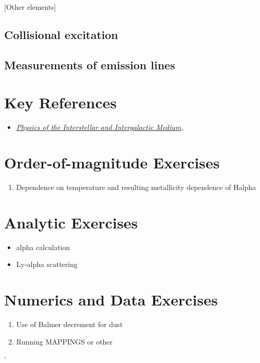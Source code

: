 [Other elements]

\subsection{Collisional excitation}

\subsection{Measurements of emission lines}

\section{Key References}

\begin{itemize}
  \item
    \href{http://}
    {\it Physics of the Interstellar and Intergalactic Medium,
      \citet{draine07a}}
\end{itemize}

\section{Order-of-magnitude Exercises}

\begin{enumerate} 
\item Dependence on temperature and resulting metallicity dependence
  of Halpha 
\end{enumerate}   

\section{Analytic Exercises}

\begin{itemize}
\item alpha calculation

\item Ly-alpha scattering
\end{itemize}

\section{Numerics and Data Exercises}

\begin{enumerate}
\item Use of Balmer decrement for dust
\item Running MAPPINGS or other
\end{enumerate}`


  
